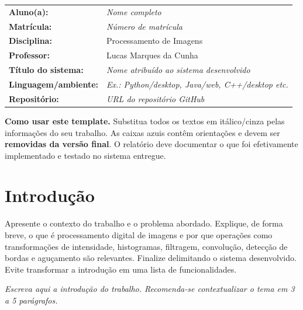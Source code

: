 \documentclass[11pt,a4paper]{article}
\newcommand{\placeholder}[1]{\textcolor{muted}{\textit{#1}}}
\begin{document}
\begin{campo}
\begin{tabularx}{\textwidth}{>{\bfseries}p{37mm}X}
Aluno(a): & \placeholder{Nome completo}\\[2mm]
Matrícula: & \placeholder{Número de matrícula}\\[2mm]
Disciplina: & Processamento de Imagens\\[2mm]
Professor: & Lucas Marques da Cunha\\[2mm]
Título do sistema: & \placeholder{Nome atribuído ao sistema desenvolvido}\\[2mm]
Linguagem/ambiente: & \placeholder{Ex.: Python/desktop, Java/web, C++/desktop etc.}\\[2mm]
Repositório: & \placeholder{URL do repositório GitHub}\\
\end{tabularx}
\end{campo}

\begin{orientacao}
\textbf{Como usar este template.} Substitua todos os textos em itálico/cinza pelas informações do seu trabalho. As caixas azuis contêm orientações e devem ser \textbf{removidas da versão final}. O relatório deve documentar o que foi efetivamente implementado e testado no sistema entregue.
\end{orientacao}

\vspace{3mm}
\tableofcontents
\newpage

\section{Introdução}

\begin{orientacao}
Apresente o contexto do trabalho e o problema abordado. Explique, de forma breve, o que é processamento digital de imagens e por que operações como transformações de intensidade, histogramas, filtragem, convolução, detecção de bordas e aguçamento são relevantes. Finalize delimitando o sistema desenvolvido. Evite transformar a introdução em uma lista de funcionalidades.
\end{orientacao}

\placeholder{Escreva aqui a introdução do trabalho. Recomenda-se contextualizar o tema em 3 a 5 parágrafos.}
\end{document}
